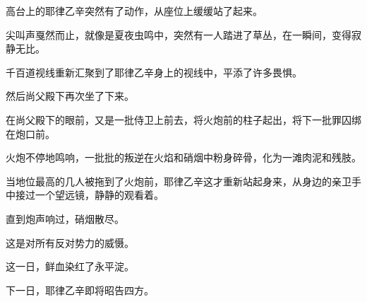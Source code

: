 高台上的耶律乙辛突然有了动作，从座位上缓缓站了起来。

尖叫声戛然而止，就像是夏夜虫鸣中，突然有一人踏进了草丛，在一瞬间，变得寂静无比。

千百道视线重新汇聚到了耶律乙辛身上的视线中，平添了许多畏惧。

然后尚父殿下再次坐了下来。

在尚父殿下的眼前，又是一批侍卫上前去，将火炮前的柱子起出，将下一批罪囚绑在炮口前。

火炮不停地鸣响，一批批的叛逆在火焰和硝烟中粉身碎骨，化为一滩肉泥和残肢。

当地位最高的几人被拖到了火炮前，耶律乙辛这才重新站起身来，从身边的亲卫手中接过一个望远镜，静静的观看着。

直到炮声响过，硝烟散尽。

这是对所有反对势力的威慑。

这一日，鲜血染红了永平淀。

下一日，耶律乙辛即将昭告四方。
